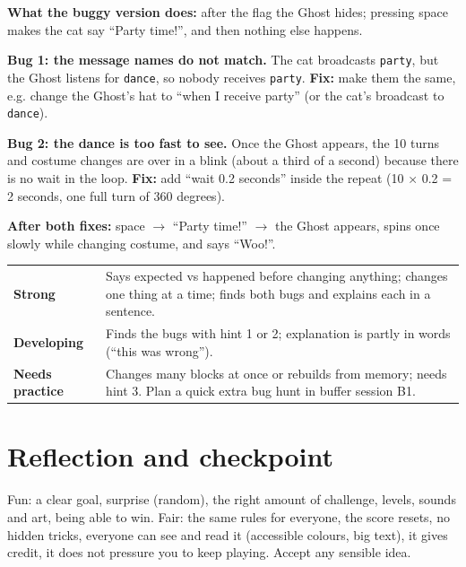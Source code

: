 \begin{answer}
\textbf{What the buggy version does:} after the flag the Ghost hides; pressing space makes the cat say \enquote{Party time!}, and then nothing else happens.

\textbf{Bug 1: the message names do not match.} The cat broadcasts \texttt{party}, but the Ghost listens for \texttt{dance}, so nobody receives \texttt{party}. \textbf{Fix:} make them the same, e.g. change the Ghost's hat to \enquote{when I receive party} (or the cat's broadcast to \texttt{dance}).

\textbf{Bug 2: the dance is too fast to see.} Once the Ghost appears, the 10 turns and costume changes are over in a blink (about a third of a second) because there is no wait in the loop. \textbf{Fix:} add \enquote{wait 0.2 seconds} inside the repeat (10 × 0.2 = 2 seconds, one full turn of 360 degrees).

\textbf{After both fixes:} space $\rightarrow$ \enquote{Party time!} $\rightarrow$ the Ghost appears, spins once slowly while changing costume, and says \enquote{Woo!}.
\end{answer}

\begin{rubric}
\begin{tabular}{@{}p{4.2cm}p{11cm}@{}}
\textbf{Strong} & Says expected vs happened before changing anything; changes one thing at a time; finds both bugs and explains each in a sentence. \\
\textbf{Developing} & Finds the bugs with hint 1 or 2; explanation is partly in words (\enquote{this was wrong}). \\
\textbf{Needs practice} & Changes many blocks at once or rebuilds from memory; needs hint 3. Plan a quick extra bug hunt in buffer session B1. \\
\end{tabular}
\end{rubric}

\section{Reflection and checkpoint}
\begin{answer}
Fun: a clear goal, surprise (random), the right amount of challenge, levels, sounds and art, being able to win. Fair: the same rules for everyone, the score resets, no hidden tricks, everyone can see and read it (accessible colours, big text), it gives credit, it does not pressure you to keep playing. Accept any sensible idea.
\end{answer}

